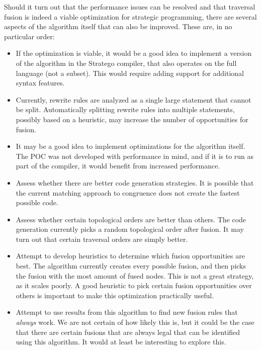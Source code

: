 Should it turn out that the performance issues can be resolved and that traversal fusion is indeed a viable optimization for strategic programming, there are several aspects of the algorithm itself that can also be improved. These are, in no particular order:
\begin{itemize}
    \item If the optimization is viable, it would be a good idea to implement a version of the algorithm in the Stratego compiler, that also operates on the full language (not a subset). This would require adding support for additional syntax features.
    \item Currently, rewrite rules are analyzed as a single large statement that cannot be split. Automatically splitting rewrite rules into multiple statements, possibly based on a heuristic, may increase the number of opportunities for fusion.
    \item It may be a good idea to implement optimizations for the algorithm itself. The POC was not developed with performance in mind, and if it is to run as part of the compiler, it would benefit from increased performance.
    \item Assess whether there are better code generation strategies. It is possible that the current matching approach to congruence does not create the fastest possible code. 
    \item Assess whether certain topological orders are better than others. The code generation currently picks a random topological order after fusion. It may turn out that certain traversal orders are simply better.
    \item Attempt to develop heuristics to determine which fusion opportunities are best. The algorithm currently creates every possible fusion, and then picks the fusion with the most amount of fused nodes. This is not a great strategy, as it scales poorly. A good heuristic to pick certain fusion opportunities over others is important to make this optimization practically useful.
    \item Attempt to use results from this algorithm to find new fusion rules that \textit{always} work. We are not certain of how likely this is, but it could be the case that there are certain fusions that are always legal that can be identified using this algorithm. It would at least be interesting to explore this.
\end{itemize}